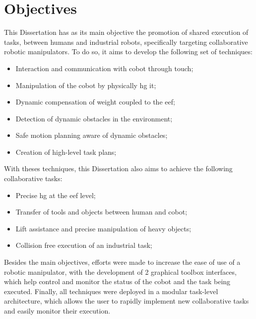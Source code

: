 \section{Objectives}

\par This Dissertation has as its main objective the promotion of shared execution of tasks, between humans and industrial robots, specifically targeting collaborative robotic manipulators. To do so, it aims to develop the following set of techniques:


\begin{itemize}
    \item Interaction and communication with cobot through touch;
    \item Manipulation of the cobot by physically \ac{hg} it;
    \item Dynamic compensation of weight coupled to the \ac{eef};
    \item Detection of dynamic obstacles in the environment;
    \item Safe motion planning aware of dynamic obstacles;
    \item Creation of high-level task plans;
\end{itemize}

\par With theses techniques, this Dissertation also aims to achieve the following collaborative tasks:

\begin{itemize}
    \item Precise \ac{hg} at the \ac{eef} level;
    \item Transfer of tools and objects between human and cobot;
    \item Lift assistance and precise manipulation of heavy objects;
    \item Collision free execution of an industrial task;
\end{itemize}

\par Besides the main objectives, efforts were made to increase the ease of use of a robotic manipulator, with the development of 2 graphical toolbox interfaces, which help control and monitor the status of the cobot and the task being executed. Finally, all techniques were deployed in a modular task-level architecture, which allows the user to rapidly implement new collaborative tasks and easily monitor their execution.





